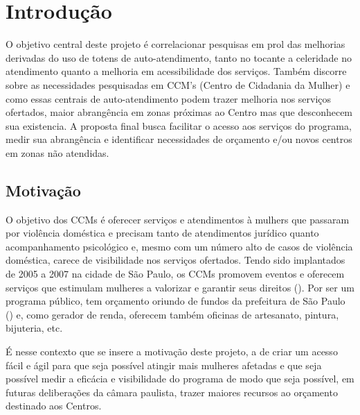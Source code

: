 \section{Introdução}
\vspace*{1cm}
O objetivo central deste projeto é correlacionar pesquisas em prol das melhorias derivadas do uso de totens de auto-atendimento, tanto no tocante a celeridade no atendimento quanto a melhoria em acessibilidade dos serviços. Também discorre sobre as necessidades pesquisadas em CCM's (Centro de Cidadania da Mulher) e como essas centrais de auto-atendimento podem trazer melhoria nos serviços ofertados, maior abrangência em zonas próximas ao Centro mas que desconhecem sua existencia. A proposta final busca facilitar o acesso aos serviços do programa, medir sua abrangência e identificar necessidades de orçamento e/ou novos centros em zonas não atendidas.
\subsection{Motivação}
O objetivo dos CCMs é oferecer serviços e atendimentos à mulhers que passaram por violência doméstica e precisam tanto de atendimentos jurídico quanto acompanhamento psicológico e, mesmo com um número alto de casos de violência doméstica, carece de visibilidade nos serviços ofertados. Tendo sido implantados de 2005 a 2007 na cidade de São Paulo, os CCMs promovem eventos e oferecem serviços que estimulam mulheres a valorizar e garantir seus direitos (\cite{centros-de-cidadania-estimulam-mulheres-a-valorizar-seus-direitos}).
Por ser um programa público, tem orçamento oriundo de fundos da prefeitura de São Paulo (\cite{politicas-para-mulheres-tem-orcamento-reforcado-com-proposta-de-vereadoras}) e, como gerador de renda, oferecem também oficinas de artesanato, pintura, bijuteria, etc.

É nesse contexto que se insere a motivação deste projeto, a de criar um acesso fácil e ágil para que seja possível atingir mais mulheres afetadas e que seja possível medir a eficácia e visibilidade do programa de modo que seja possível, em futuras deliberações da câmara paulista, trazer maiores recursos ao orçamento destinado aos Centros.

